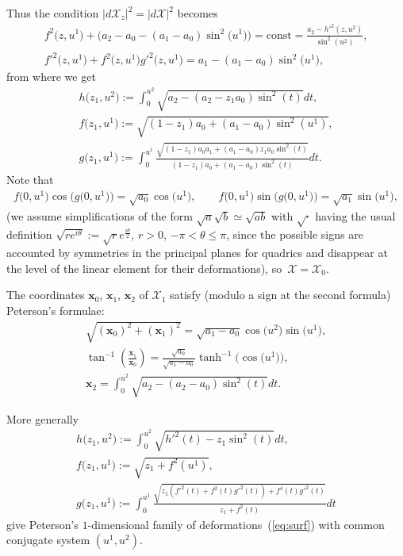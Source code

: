 \documentclass[pdftex]{sigma}
\begin{document}
Thus the condition $|d\mathcal{X}_z|^2=|d\mathcal{X}|^2$ becomes
\begin{gather*}
f^2\big(z,u^1\big)+\big(a_2-a_0-(a_1-a_0)\sin^2\big(u^1\big)\big)=\mathrm{const}=
\frac{a_2-h'^2(z,u^2)}{\sin^2(u^2)},
\\
f'^2\big(z,u^1\big)+f^2\big(z,u^1\big)g'^2\big(z,u^1\big)=a_1-(a_1-a_0)\sin^2\big(u^1\big),
\end{gather*}
from where we get
\begin{gather}
h\big(z_1,u^2\big):=\int_0^{u^2}\sqrt{a_2-(a_2-z_1a_0)\sin^2(t)}dt,\nonumber\\
f\big(z_1,u^1\big):=\sqrt{(1-z_1)a_0+(a_1-a_0)\sin^2(u^1)},\nonumber\\
g\big(z_1,u^1\big):=\int_0^{u^1}\frac{\sqrt{(1-z_1)a_0a_1+(a_1-a_0)z_1a_0\sin^2(t)}}
{(1-z_1)a_0+(a_1-a_0)\sin^2(t)}dt.\label{eq:fg}
\end{gather}
Note that
\begin{gather}
f\big(0,u^1\big)\cos\big(g\big(0,u^1\big)\big)=\sqrt{a_0}\cos\big(u^1\big),\qquad
f\big(0,u^1\big)\sin\big(g\big(0,u^1\big)\big)=\sqrt{a_1}\sin\big(u^1\big),\label{eq:fg0}
\end{gather}
(we assume simplif\/ications of the form
$\sqrt{a}\sqrt{b}\simeq\sqrt{ab}$ with $\sqrt{\cdot}$ having the
usual def\/inition
$\sqrt{re^{i\theta}}:=\sqrt{r}e^{\frac{i\theta}{2}}$, $r>0$,
$-\pi<\theta\le\pi$, since the possible signs are accounted by
symmetries in the principal planes for quadrics and disappear at
the level of the linear element for their deformations), so~$\mathcal{X}=\mathcal{X}_0$.

The coordinates $\mathbf{x}_0$, $\mathbf{x}_1$, $\mathbf{x}_2$ of
$\mathcal{X}_1$ satisfy (modulo a sign at the second formula)
Peterson's formulae:
\begin{gather}
\sqrt{(\mathbf{x}_0)^2+(\mathbf{x}_1)^2}=\sqrt{a_1-a_0}\cos\big (u^2\big) \sin\big(u^1\big),\nonumber\\
\tan^{-1}\left(\frac{\mathbf{x}_1}{\mathbf{x}_0}\right)=
\frac{\sqrt{a_0}}{\sqrt{a_1-a_0}}\tanh^{-1}\big(\cos\big(u^1\big)\big),\nonumber\\
\mathbf{x}_2=\int_0^{u^2}\sqrt{a_2-(a_2-a_0)\sin^2(t)}dt.\label{eq:pf2}
\end{gather}

More generally
\begin{gather}
h\big(z_1,u^2\big):=\int_0^{u^2}\sqrt{h'^2(t)-z_1\sin^2(t)}dt,\nonumber\\
f\big(z_1,u^1\big):=\sqrt{z_1+f^2(u^1)},\nonumber\\
g\big(z_1,u^1\big):=\int_0^{u^1}\frac{\sqrt{z_1(f'^2(t)+f^2(t)g'^2(t))+f^4(t)g'^2(t)}}
{z_1+f^2(t)}dt\label{eq:bla}
\end{gather}
give Peterson's $1$-dimensional family of deformations~(\ref{eq:surf}) with common conjugate system $(u^1,u^2)$.
\end{document}
